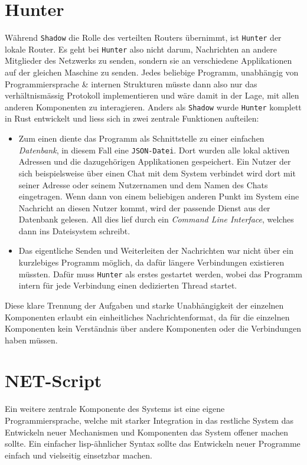 \documentclass[11pt]{report}
\begin{document}
\section{Hunter}
\label{sec:orgd1d87bd}
Während \texttt{Shadow} die Rolle des verteilten Routers übernimmt, ist \texttt{Hunter}
der lokale Router. Es geht bei \texttt{Hunter} also nicht darum, Nachrichten an
andere Mitglieder des Netzwerks zu senden, sondern sie an verschiedene
Applikationen auf der gleichen Maschine zu senden. Jedes beliebige
Programm, unabhängig von Programmiersprache \& internen Strukturen
müsste dann also nur das verhältnismässig Protokoll implementieren und
wäre damit in der Lage, mit allen anderen Komponenten zu interagieren.
Anders als \texttt{Shadow} wurde \texttt{Hunter} komplett in Rust entwickelt und liess
sich in zwei zentrale Funktionen aufteilen:
\begin{itemize}
\item Zum einen diente das Programm als Schnittstelle zu einer einfachen
\emph{Datenbank}, in diesem Fall eine \texttt{JSON-Datei}. Dort wurden alle lokal
aktiven Adressen und die dazugehörigen Applikationen gespeichert.
Ein Nutzer der sich beispielsweise über einen Chat mit dem System
verbindet wird dort mit seiner Adresse oder seinem Nutzernamen und
dem Namen des Chats eingetragen. Wenn dann von einem beliebigen
anderen Punkt im System eine Nachricht an diesen Nutzer kommt, wird
der passende Dienst aus der Datenbank gelesen. All dies lief durch
ein \emph{Command Line Interface}, welches dann ins Dateisystem schreibt.
\item Das eigentliche Senden und Weiterleiten der Nachrichten war nicht
über ein kurzlebiges Programm möglich, da dafür längere Verbindungen
existieren müssten. Dafür muss \texttt{Hunter} als erstes gestartet werden,
wobei das Programm intern für jede Verbindung einen dedizierten
Thread startet.
\end{itemize}

Diese klare Trennung der Aufgaben und starke Unabhängigkeit der
einzelnen Komponenten erlaubt ein einheitliches Nachrichtenformat, da
für die einzelnen Komponenten kein Verständnis über andere Komponenten
oder die Verbindungen haben müssen. 
\section{NET-Script}
\label{sec:org6cee0df}
Ein weitere zentrale Komponente des Systems ist eine eigene
Programmiersprache, welche mit starker Integration in das restliche
System das Entwickeln neuer Mechanismen und Komponenten das System
offener machen sollte. Ein einfacher lisp-ähnlicher Syntax sollte das
Entwickeln neuer Programme einfach und vielseitig einsetzbar machen.
\end{document}
